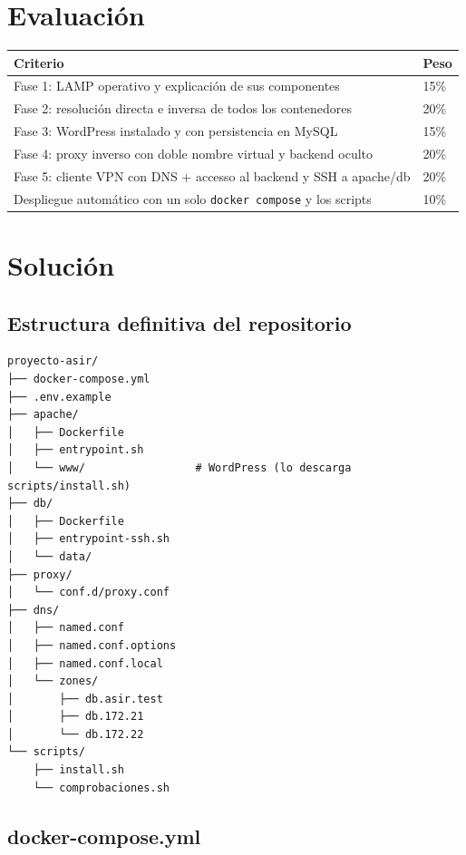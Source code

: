 \documentclass[11pt]{article}
\begin{document}
\section{Evaluación}
\label{sec:org000006c}

\begin{center}
\begin{tabular}{ll}
Criterio & Peso\\
\hline
Fase 1: LAMP operativo y explicación de sus componentes & 15\%\\
Fase 2: resolución directa e inversa de todos los contenedores & 20\%\\
Fase 3: WordPress instalado y con persistencia en MySQL & 15\%\\
Fase 4: proxy inverso con doble nombre virtual y backend oculto & 20\%\\
Fase 5: cliente VPN con DNS + accesso al backend y SSH a apache/db & 20\%\\
Despliegue automático con un solo \texttt{docker compose} y los scripts & 10\%\\
\end{tabular}
\end{center}
\section{Solución}
\label{sec:org00000a5}

\subsection{Estructura definitiva del repositorio}
\label{sec:org000006f}

\begin{lstlisting}[language=text,numbers=none]
proyecto-asir/
├── docker-compose.yml
├── .env.example
├── apache/
│   ├── Dockerfile
│   ├── entrypoint.sh
│   └── www/                 # WordPress (lo descarga scripts/install.sh)
├── db/
│   ├── Dockerfile
│   ├── entrypoint-ssh.sh
│   └── data/
├── proxy/
│   └── conf.d/proxy.conf
├── dns/
│   ├── named.conf
│   ├── named.conf.options
│   ├── named.conf.local
│   └── zones/
│       ├── db.asir.test
│       ├── db.172.21
│       └── db.172.22
└── scripts/
    ├── install.sh
    └── comprobaciones.sh
\end{lstlisting}
\subsection{docker-compose.yml}
\label{sec:org0000072}
\end{document}
